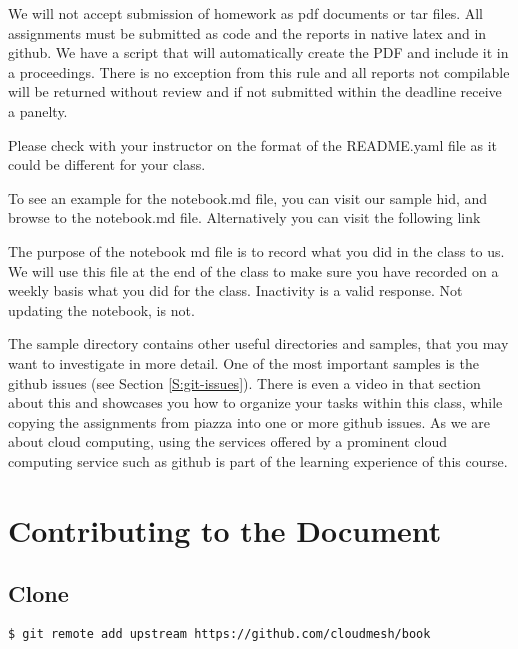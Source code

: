 We will not accept submission of homework as pdf documents or tar
files. All assignments must be submitted as code and the reports in
native latex and in github. We have a script that will automatically
create the PDF and include it in a proceedings. There is no exception
from this rule and all reports not compilable will be returned without
review and if not submitted within the deadline receive a panelty.

Please check with your instructor on the format of the README.yaml
file as it could be different for your class. 

To see an example for the notebook.md file, you can visit our sample
hid, and browse to the notebook.md file. Alternatively you can visit
the following link 


The purpose of the notebook md file is to record what you did in the
class to us. We will use this file at the end of the class to make
sure you have recorded on a weekly basis what you did for the
class. Inactivity is a valid response. Not updating the notebook, is
not.

The sample directory contains other useful directories and samples,
that you may want to investigate in more detail. One of the most
important samples is the github issues (see Section
\ref{S:git-issues}). There is even a video in that section about this
and showcases you how to organize your tasks within this class, while
copying the assignments from piazza into one or more github issues.
As we are about cloud computing, using the services offered by a
prominent cloud computing service such as github is part of the
learning experience of this course. 

\section{Contributing to the Document}



\subsection{Clone}

\begin{verbatim}
$ git remote add upstream https://github.com/cloudmesh/book
\end{verbatim}


